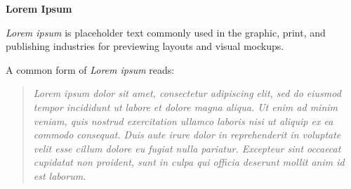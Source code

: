 \textbf{Lorem Ipsum}

\textit{Lorem ipsum} is placeholder text commonly used in the graphic, print, and publishing industries for previewing layouts and visual mockups.

A common form of \textit{Lorem ipsum} reads:

\begin{quotation}
{\itshape Lorem ipsum dolor sit amet, consectetur adipiscing elit, sed do eiusmod tempor incididunt ut labore et dolore magna aliqua. Ut enim ad minim veniam, quis nostrud exercitation ullamco laboris nisi ut aliquip ex ea commodo consequat. Duis aute irure dolor in reprehenderit in voluptate velit esse cillum dolore eu fugiat nulla pariatur. Excepteur sint occaecat cupidatat non proident, sunt in culpa qui officia deserunt mollit anim id est laborum.}
\end{quotation}